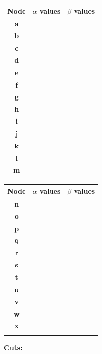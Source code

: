 \documentclass[11pt,a4paper]{report}
\begin{document}
\begin{answers}[8cm]
      \begin{multicols}{2}
      \begin{tabular}{ccc}
      Node & $\alpha$ values & $\beta$ values\\
      \hline
      \textbf{a} &  &  \\ %
      \textbf{b} &  &  \\
      \textbf{c} &  &  \\
      \textbf{d} &  &  \\
      \textbf{e} &  &  \\
      \textbf{f} &  &  \\
      \textbf{g} &  &  \\
      \textbf{h} &  &  \\
      \textbf{i} &  &  \\
      \textbf{j} &  &  \\
      \textbf{k} &  &  \\
      \textbf{l} &  &  \\
      \textbf{m} &  &  \\ 
      \end{tabular}
      
      \begin{tabular}{ccc}
      Node & $\alpha$ values & $\beta$ values\\
      \hline
      \textbf{n} &  &  \\
      \textbf{o} &  &  \\
      \textbf{p} &  &  \\
      \textbf{q} &  &  \\
      \textbf{r} &  &  \\
      \textbf{s} &  &  \\
      \textbf{t} &  &  \\
      \textbf{u} &  &  \\
      \textbf{v} &  &  \\
      \textbf{w} &  &  \\
      \textbf{x} &  &  \\
       &  &  \\
      \end{tabular}
      \end{multicols}
      
\textbf{Cuts:} %
\end{answers}
\end{document}
